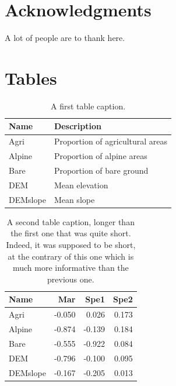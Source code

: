\documentclass[a4paper,12pt]{article}
\begin{document}
\section*{Acknowledgments}

A lot of people are to thank here.


\newpage





\newpage


\section*{Tables}


\begin{table}[h!]
  \caption{A first table caption.}
  \label{Tab1}
  \begin{center}
    \begin{tabular}{p{3cm}p{10cm}}
      Name & Description \\
      \hline
      Agri & Proportion of agricultural areas \\
      Alpine & Proportion of alpine areas \\
      Bare & Proportion of bare ground \\
      DEM & Mean elevation \\
      DEMslope & Mean slope \\
      \hline
    \end{tabular}
  \end{center}
\end{table}


\newpage


\begin{table}[h!]
  \caption{A second table caption, longer than the first one that was
quite short. Indeed, it was supposed to be short, at the contrary of this one which is
much more informative than the previous one.}
  \label{Tab2}
  \begin{center}
    \begin{tabular}{lrrr}
      Name & Mar & Spe1 & Spe2 \\
      \hline
      Agri & -0.050 & 0.026 & 0.173 \\
      Alpine & -0.874 & -0.139 & 0.184 \\
      Bare & -0.555 & -0.922 & 0.084 \\
      DEM & -0.796 & -0.100 & 0.095 \\
      DEMslope & -0.167 & -0.205 & 0.013 \\
      \hline
    \end{tabular}
  \end{center}
\end{table}
\end{document}
